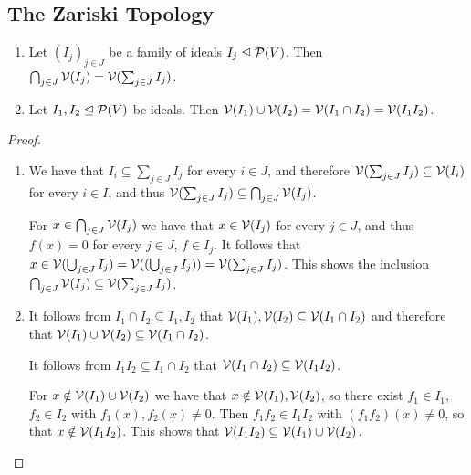 \subsection{The Zariski Topology}


\begin{lemma}
  \label{lemma: intersections and unions of Zariski closed sets}
  \leavevmode
  \begin{enumerate}
    \item
      Let $(I_j)_{j \in J}$ be a family of ideals $I_j \trianglelefteq \mathcal{P}(V)$.
      Then $\bigcap_{j \in J} \mathcal{V}(I_j) = \mathcal{V}( \sum_{j \in J} I_j )$.
    \item
      Let $I_1, I_2 \trianglelefteq \mathcal{P}(V)$ be ideals.
      Then $\mathcal{V}(I_1) \cup \mathcal{V}(I_2) = \mathcal{V}(I_1 \cap I_2) = \mathcal{V}(I_1 I_2)$.
  \end{enumerate}
\end{lemma}
\begin{proof}
  \leavevmode
  \begin{enumerate}
    \item
      We have that $I_i \subseteq \sum_{j \in J} I_j$ for every $i \in J$, and therefore $\mathcal{V}( \sum_{j \in J} I_j ) \subseteq \mathcal{V}(I_i)$ for every $i \in I$, and thus $\mathcal{V}( \sum_{j \in J} I_j ) \subseteq \bigcap_{j \in J} \mathcal{V}(I_j)$.
      
      For $x \in \bigcap_{j \in J} \mathcal{V}(I_j)$ we have that $x \in \mathcal{V}(I_j)$ for every $j \in J$, and thus $f(x) = 0$ for every $j \in J$, $f \in I_j$.
      It follows that $x \in \mathcal{V}( \bigcup_{j \in J} I_j ) = \mathcal{V}( (\bigcup_{j \in J} I_j) ) = \mathcal{V}( \sum_{j \in J} I_j )$.
      This shows the inclusion $\bigcap_{j \in J} \mathcal{V}(I_j) \subseteq \mathcal{V}( \sum_{j \in J} I_j )$.
    \item
      It follows from $I_1 \cap I_2 \subseteq I_1, I_2$ that $\mathcal{V}(I_1), \mathcal{V}(I_2) \subseteq \mathcal{V}(I_1 \cap I_2)$ and therefore that $\mathcal{V}(I_1) \cup \mathcal{V}(I_2) \subseteq \mathcal{V}(I_1 \cap I_2)$.
      
      It follows from $I_1 I_2 \subseteq I_1 \cap I_2$ that $\mathcal{V}(I_1 \cap I_2) \subseteq \mathcal{V}(I_1 I_2)$.
      
      For $x \notin \mathcal{V}(I_1) \cup \mathcal{V}(I_2)$ we have that $x \notin \mathcal{V}(I_1), \mathcal{V}(I_2)$, so there exist $f_1 \in I_1$, $f_2 \in I_2$ with $f_1(x), f_2(x) \neq 0$.
      Then $f_1 f_2 \in I_1 I_2$ with $(f_1 f_2)(x) \neq 0$, so that $x \notin \mathcal{V}(I_1 I_2)$.
      This shows that $\mathcal{V}(I_1 I_2) \subseteq \mathcal{V}(I_1) \cup \mathcal{V}(I_2)$.
    \qedhere
  \end{enumerate}
\end{proof}


